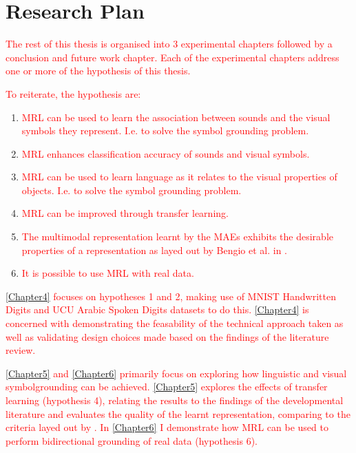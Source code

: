 \section{Research Plan}
\textcolor{red}{The rest of this thesis is organised into 3 experimental chapters followed by a conclusion and future work chapter.
Each of the experimental chapters address one or more of the hypothesis of this thesis.}

\textcolor{red}{To reiterate, the hypothesis are:}

\begin{enumerate}

	\item \textcolor{red}{\ac{MRL} can be used to learn the association between sounds and the visual symbols they represent. I.e. to solve the symbol grounding problem.}
	\item \textcolor{red}{\ac{MRL} enhances classification accuracy of sounds and visual symbols.}
	\item \textcolor{red}{\ac{MRL} can be used to learn language as it relates to the visual properties of objects. I.e. to solve the symbol grounding problem.}
	\item \textcolor{red}{\ac{MRL} can be improved through transfer learning.}
	\item \textcolor{red}{The multimodal representation learnt by the \acp{MAE} exhibits the desirable properties of a representation as layed out by Bengio et al. in \cite{repRev}.}		
	\item \textcolor{red}{It is possible to use \ac{MRL} with real data.}
	
\end{enumerate}

\textcolor{red}{\autoref{Chapter4} focuses on hypotheses 1 and 2, making use of MNIST Handwritten Digits and UCU Arabic Spoken Digits datasets to do this. \autoref{Chapter4} is concerned with demonstrating the feasability of the technical approach taken as well as validating design choices made based on the findings of the literature review.}  

\textcolor{red}{\autoref{Chapter5} and \autoref{Chapter6} primarily focus on exploring how linguistic and visual symbolgrounding can be achieved. \autoref{Chapter5} explores the effects of transfer learning (hypothesis 4), relating the results to the findings of the developmental literature and evaluates the quality of the learnt representation, comparing to the criteria layed out by \cite{repRev}. In \autoref{Chapter6} I demonstrate how \ac{MRL} can be used to perform bidirectional grounding of real data (hypothesis 6). } 
